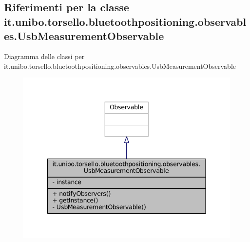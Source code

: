 \hypertarget{classit_1_1unibo_1_1torsello_1_1bluetoothpositioning_1_1observables_1_1UsbMeasurementObservable}{}\subsection{Riferimenti per la classe it.\+unibo.\+torsello.\+bluetoothpositioning.\+observables.\+Usb\+Measurement\+Observable}
\label{classit_1_1unibo_1_1torsello_1_1bluetoothpositioning_1_1observables_1_1UsbMeasurementObservable}


Diagramma delle classi per it.\+unibo.\+torsello.\+bluetoothpositioning.\+observables.\+Usb\+Measurement\+Observable
\nopagebreak
\begin{figure}[H]
\begin{center}
\leavevmode
\includegraphics[width=342pt]{classit_1_1unibo_1_1torsello_1_1bluetoothpositioning_1_1observables_1_1UsbMeasurementObservable__inherit__graph}
\end{center}
\end{figure}


